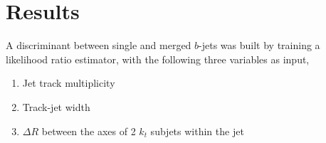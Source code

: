 \section{Results}





A discriminant between single and merged $b$-jets was built by training a likelihood ratio estimator, with the following three variables as input, 
%
\begin{enumerate}\addtolength{\itemsep}{-0.4\baselineskip}
\item
Jet track multiplicity
\item
Track-jet width
\item
$\Delta R$ between the axes of 2 $k_t$ subjets within the jet
\end{enumerate}
%

